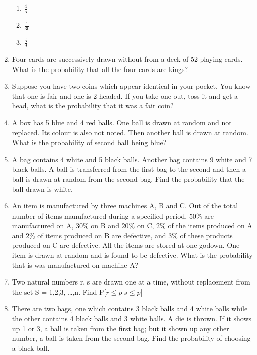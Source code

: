 \begin{enumerate}[label=\thesubsection.\arabic*,ref=\thesubsection.\theenumi]
\begin{enumerate}
\item $\frac{4}{5}$
\item $\frac{1}{30}$ 
\item $\frac{5}{9}$
\end{enumerate}
\solution
%
\item Four cards are successively drawn without from a deck of 52 playing cards. What is the probability that all the four cards are kings?
\\
%
\item Suppose you have two coins which appear identical in your pocket. You know
that one is fair and one is 2-headed. If you take one out, toss it and get a head,
what is the probability that it was a fair coin?
\\
%
\item A box has 5 blue and 4 red balls. One ball is drawn at random and not replaced. Its colour is also not noted. Then another ball is drawn at random. What is the probability of second ball being blue?
\solution
\\
%
\item A bag contains 4 white and 5 black balls. Another bag contains 9 white and 7 black balls. A ball is transferred from the first bag to the second and then a ball is drawn at random from the second bag. Find the probability that the ball drawn is white.
\\
%
\item An item is manufactured by three machines A, B and C. Out of the total number of items manufactured during a specified period, $50\%$ are manufactured on A, $30\%$ on B and $20\%$ on C, $2\%$ of the items produced on A and $2\%$ of items produced on B are defective, and $3\%$ of these products produced on C are defective. All the items are stored at one godown. One item is drawn at random and is found to be defective. What is the probability that is was manufactured on machine A?
\solution
\\
%
\item Two natural numbers r, s are drawn one at a time, without replacement from
the set S = {1,2,3, \ldots,n}. Find P[$r\le p|s\le p$]
%
\item There are two bags, one which contains 3 black balls and 4 white balls while the other contains 4 black balls and 3 white balls. A die is thrown. If it shows up 1 or 3, a ball is taken from the first bag; but it shown up any other number, a ball is taken from the second bag. Find the probability of choosing a black ball.

\end{enumerate}
